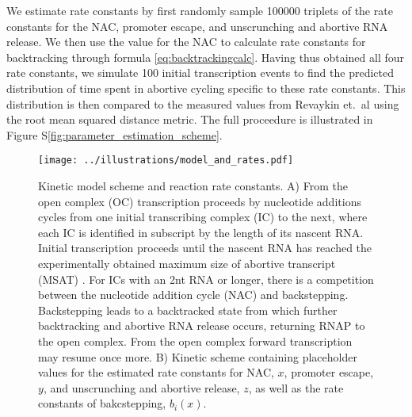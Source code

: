 We estimate rate constants by first randomly sample 100000 triplets of the
rate constants for the NAC, promoter escape, and unscrunching and abortive RNA
release. We then use the value for the NAC to calculate rate constants for
backtracking through formula \eqref{eq:backtrackingcalc}. Having thus obtained
all four rate constants, we simulate 100 initial transcription events to find the
predicted distribution of time spent in abortive cycling specific to these
rate constants. This distribution is then compared to the measured values from
Revaykin et.\ al \cite{revyakin_abortive_2006} using the root mean squared
distance metric. The full proceedure is illustrated in Figure
S\ref{fig:parameter_estimation_scheme}.

\begin{figure}
	\begin{center}
        \texttt{[image: ../illustrations/model\_and\_rates.pdf]}
	\end{center}
    \caption{Kinetic model scheme and reaction rate constants. A) From the
    open complex (OC) transcription proceeds by nucleotide additions cycles
    from one initial transcribing complex (IC) to the next, where each IC is
    identified in subscript by the length of its nascent RNA. Initial
    transcription proceeds until the nascent RNA has reached the
    experimentally obtained maximum size of abortive transcript (MSAT)
    \cite{hsu_initial_2006}. For ICs with an 2nt RNA or longer, there is a
    competition between the nucleotide addition cycle (NAC) and backstepping.
    Backstepping leads to a backtracked state from which further backtracking
    and abortive RNA release occurs, returning RNAP to the open complex. From
    the open complex forward transcription may resume once more. B) Kinetic
    scheme containing placeholder values for the estimated rate constants for
    NAC, $x$, promoter escape, $y$, and unscrunching and abortive release, $z$,
    as well as the rate constants of bakcstepping, $b_i(x)$.}
    \label{fig:model_and_rates}
\end{figure}

